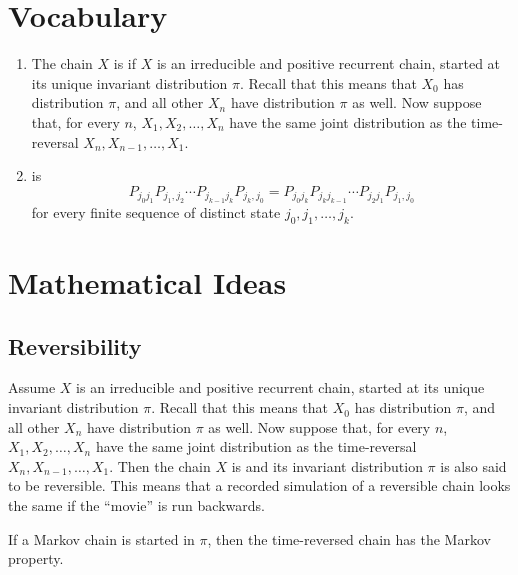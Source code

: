 \documentclass[12pt]{article}
\begin{document}
\section*{Vocabulary}
\begin{enumerate}
  \item  The chain $X$ is  if  $X$ is an irreducible and positive recurrent chain, started at its unique invariant
distribution $\pi$. Recall that this means that $X_0$ has distribution
$\pi$, and all other $X_n$ have distribution $\pi$ as well.
Now suppose that, for every $n$, $X_1, X_2, \dots , X_n$ have the same joint distribution as the time-reversal
$X_n, X_{n−1}, \dots , X_1$.
\item  {} is
  \[
  P_{j_0 j_1} P_{j_1,j_2} \cdots P_{j_{k-1} j_k} P_{j_k, j_0} =
  P_{j_0 j_k} P_{j_k j_{k-1}} \cdots P_{j_2 j_1} P_{j_1, j_0}
\]
for every finite sequence of distinct state $j_0, j_1, \dots, j_k$.
\end{enumerate}

\hr

\section*{Mathematical Ideas}
\subsection*{Reversibility}

Assume $X$ is an irreducible and positive recurrent chain, started at its unique invariant
distribution $\pi$. Recall that this means that $X_0$ has distribution
$\pi$, and all other $X_n$ have distribution $\pi$ as well.
Now suppose that, for every $n$, $X_1, X_2, \dots , X_n$ have the same joint distribution as the time-reversal
$X_n, X_{n−1}, \dots , X_1$. Then the chain $X$ is 
and its invariant distribution $\pi$ is also said to be reversible. This means that a recorded simulation of a reversible
chain looks the same if the ``movie'' is run backwards.

\begin{proposition}
  If a Markov chain is started in $\pi$, then the time-reversed chain
  has the Markov property.
\end{proposition}
\end{document}
